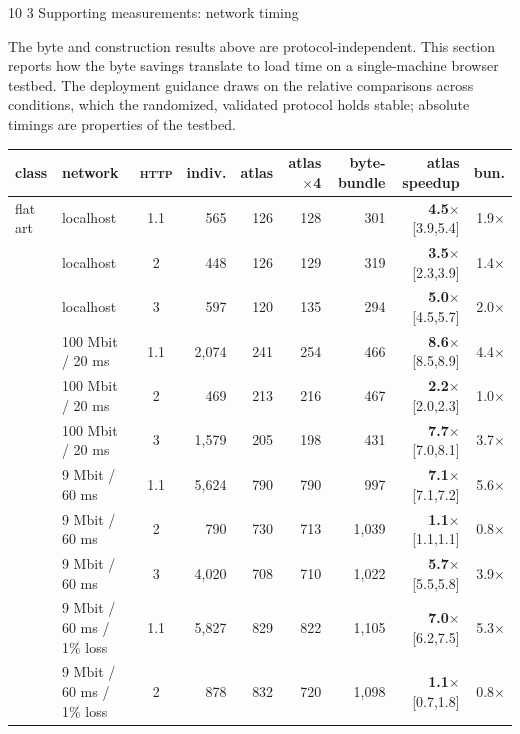 \documentclass[3p,twocolumn]{elsarticle}
\makeatletter
\newcommand{\rng}[1]{{\scriptsize\color{greyx}#1}}
\renewcommand\subsection{\@startsection{subsection}{2}{\z@}%
           {10\p@ \@plus 3\p@ \@minus 3\p@}%
           {3\p@ \@plus 2\p@ \@minus 1\p@}%
           {\normalfont\normalsize\itshape}}
\makeatother
\begin{document}
\subsection{Supporting measurements: network
timing}

The byte and construction results above are protocol-independent. This
section reports how the byte savings translate to load time on a
single-machine browser testbed. The deployment guidance draws on the
relative comparisons across conditions, which the randomized, validated
protocol holds stable; absolute timings are properties of the testbed.

\begin{table}[t]
\centering
\footnotesize
\setlength{\tabcolsep}{4pt}
\begin{tabular}{@{}ll c rrrr r r@{}}
\toprule
class & network & \textsc{http} & indiv. & atlas & atlas$\times$4 & byte-bundle & atlas speedup & bun. \\
\midrule
flat art & localhost & 1.1 & 565 & 126 & 128 & 301 & \textbf{4.5$\times$}~\rng{[3.9,5.4]} & 1.9$\times$ \\
 & localhost & 2 & 448 & 126 & 129 & 319 & \textbf{3.5$\times$}~\rng{[2.3,3.9]} & 1.4$\times$ \\
 & localhost & 3 & 597 & 120 & 135 & 294 & \textbf{5.0$\times$}~\rng{[4.5,5.7]} & 2.0$\times$ \\
 & 100 Mbit / 20 ms & 1.1 & 2,074 & 241 & 254 & 466 & \textbf{8.6$\times$}~\rng{[8.5,8.9]} & 4.4$\times$ \\
 & 100 Mbit / 20 ms & 2 & 469 & 213 & 216 & 467 & \textbf{2.2$\times$}~\rng{[2.0,2.3]} & 1.0$\times$ \\
 & 100 Mbit / 20 ms & 3 & 1,579 & 205 & 198 & 431 & \textbf{7.7$\times$}~\rng{[7.0,8.1]} & 3.7$\times$ \\
 & 9 Mbit / 60 ms & 1.1 & 5,624 & 790 & 790 & 997 & \textbf{7.1$\times$}~\rng{[7.1,7.2]} & 5.6$\times$ \\
 & 9 Mbit / 60 ms & 2 & 790 & 730 & 713 & 1,039 & \textbf{1.1$\times$}~\rng{[1.1,1.1]} & 0.8$\times$ \\
 & 9 Mbit / 60 ms & 3 & 4,020 & 708 & 710 & 1,022 & \textbf{5.7$\times$}~\rng{[5.5,5.8]} & 3.9$\times$ \\
 & 9 Mbit / 60 ms / 1\% loss & 1.1 & 5,827 & 829 & 822 & 1,105 & \textbf{7.0$\times$}~\rng{[6.2,7.5]} & 5.3$\times$ \\
 & 9 Mbit / 60 ms / 1\% loss & 2 & 878 & 832 & 720 & 1,098 & \textbf{1.1$\times$}~\rng{[0.7,1.8]} & 0.8$\times$ \\

\end{tabular}
\end{table}
\end{document}
